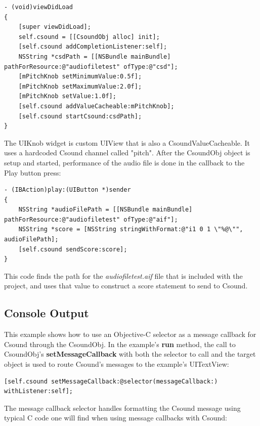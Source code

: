 \documentclass[11pt]{article}
\begin{document}
\begin{lstlisting}[caption=CsoundObj setup code]
- (void)viewDidLoad
{
    [super viewDidLoad];
    self.csound = [[CsoundObj alloc] init];
    [self.csound addCompletionListener:self];
    NSString *csdPath = [[NSBundle mainBundle] pathForResource:@"audiofiletest" ofType:@"csd"];
    [mPitchKnob setMinimumValue:0.5f];
    [mPitchKnob setMaximumValue:2.0f];
    [mPitchKnob setValue:1.0f];
    [self.csound addValueCacheable:mPitchKnob];
    [self.csound startCsound:csdPath];
}
\end{lstlisting}

The UIKnob widget is custom UIView that is also a CsoundValueCacheable.  It uses a hardcoded Csound channel called "pitch".  After the CsoundObj object is setup and started, performance of the audio file is done in the callback to the Play button press:

\begin{lstlisting}[caption=Play button callback code]
- (IBAction)play:(UIButton *)sender
{
    NSString *audioFilePath = [[NSBundle mainBundle] pathForResource:@"audiofiletest" ofType:@"aif"];
    NSString *score = [NSString stringWithFormat:@"i1 0 1 \"%@\"", audioFilePath];
    [self.csound sendScore:score];
}
\end{lstlisting}

This code finds the path for the \emph{audiofiletest.aif} file that is included with the project, and uses that value to construct a score statement to send to Csound. 

\subsection{Console Output}

This example shows how to use an Objective-C selector as a message callback for Csound through the CsoundObj.  In the example's \textbf{run} method, the call to CsoundObj's \textbf{setMessageCallback} with both the selector to call and the target object is used to route Csound's messages to the example's UITextView:

\begin{lstlisting}[caption=Example of setting message callback]
    [self.csound setMessageCallback:@selector(messageCallback:) withListener:self];
\end{lstlisting}

The message callback selector handles formatting the Csound message using typical C code one will find when using message callbacks with Csound:
\end{document}
